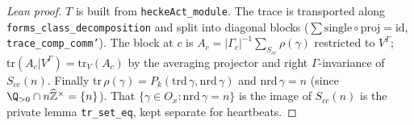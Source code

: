 \begin{proof}[Lean proof]
$T$ is built from \texttt{heckeAct\_module}. The trace is transported along \texttt{forms\_class\_decomposition} and split into diagonal blocks ($\sum\mathrm{single}\circ\mathrm{proj}=\mathrm{id}$, \texttt{trace\_comp\_comm'}). The block at $c$ is $A_c=|\Gamma_c|^{-1}\sum_{S_{cc}}\rho(\gamma)$ restricted to $V^\Gamma$; $\mathrm{tr}(A_c|V^\Gamma)=\mathrm{tr}_V(A_c)$ by the averaging projector and right $\Gamma$-invariance of $S_{cc}(n)$. Finally $\mathrm{tr}\,\rho(\gamma)=P_k(\mathrm{trd}\,\gamma,\mathrm{nrd}\,\gamma)$ and $\mathrm{nrd}\,\gamma=n$ (since $\Q_{>0}\cap n\widehat{\mathbb Z}^\times=\{n\}$). That $\{\gamma\in O_x:\mathrm{nrd}\,\gamma=n\}$ is the image of $S_{cc}(n)$ is the private lemma \texttt{tr\_set\_eq}, kept separate for heartbeats.
\end{proof}

